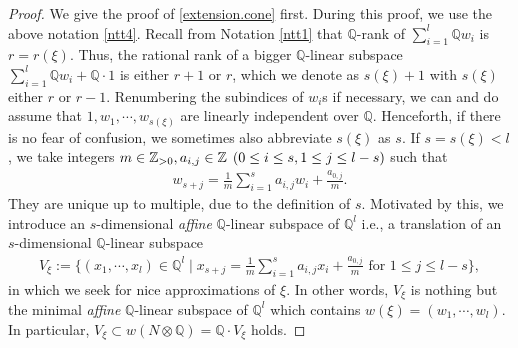 \documentclass[12pt,a4paper]{amsart}
\theoremstyle{remark}
\theoremstyle{definition}
\def\Z{\mathbb{Z}}
\def\Q{\mathbb{Q}}
\begin{document}
\begin{proof}

We give the proof of \eqref{extension.cone} first. 
During this proof, we use the above notation \ref{ntt4}. 
Recall from Notation \ref{ntt1} that $\Q$-rank of 
$\sum_{i=1}^l \Q w_i$ is $r=r(\xi)$. 
Thus, the rational rank of a bigger $\Q$-linear subspace 
$\sum_{i=1}^l \Q w_i+\Q\cdot 1$ is either $r+1$ or $r$, 
which we denote as $s(\xi)+1$ with $s(\xi)$ either $r$ or $r-1$. 
Renumbering the subindices of $w_i$s if necessary, we can and do assume that 
$1, w_1,\cdots,w_{s(\xi)}$ are linearly independent over $\Q$. 
Henceforth, 
if there is no fear of confusion, we sometimes also abbreviate 
$s(\xi)$ as $s$. 
If $s=s(\xi)<l$, 
we take integers $m\in \Z_{>0}, a_{i,j}\in \Z\hspace{1.5mm} 
(0\le i\le s, 1\le j\le l-s)$ such that 
\begin{align}\label{w.rel}
w_{s+j}=\frac{1}{m}\sum_{i=1}^s a_{i,j}w_i+\frac{a_{0,j}}{m}. 
\end{align}
They are unique up to multiple, due to the definition of $s$. 
Motivated by this, we introduce 
an $s$-dimensional {\it affine} $\Q$-linear subspace of $\Q^l$ i.e., 
a translation of an $s$-dimensional $\Q$-linear subspace 
\begin{align}\label{Vxi}
V_\xi:=\{(x_1,\cdots,x_l)\in \Q^l\mid 
x_{s+j}=\frac{1}{m}\sum_{i=1}^s a_{i,j}x_i+\frac{a_{0,j}}{m} \text{ for } 1\le j\le l-s\},
\end{align}
in which we seek for nice approximations of $\xi$. 
In other words, 
$V_\xi$ is nothing but the 
minimal {\it affine} $\Q$-linear subspace of $\Q^l$ which contains 
$w(\xi)=(w_1,\cdots,w_l)$. 
In particular, 
$V_\xi\subset w(N\otimes \Q)=\Q\cdot V_\xi$ holds. 


\end{proof}
\end{document}
